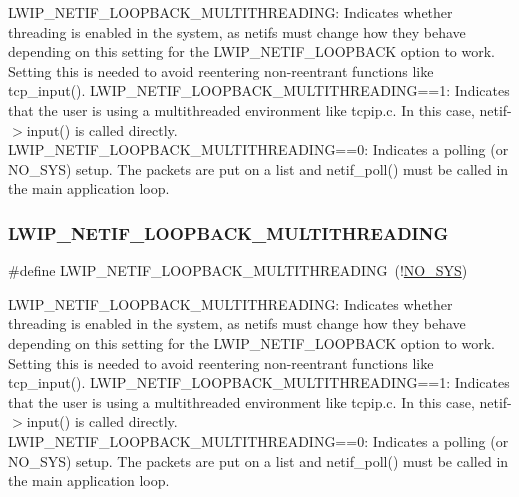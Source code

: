 L\+W\+I\+P\+\_\+\+N\+E\+T\+I\+F\+\_\+\+L\+O\+O\+P\+B\+A\+C\+K\+\_\+\+M\+U\+L\+T\+I\+T\+H\+R\+E\+A\+D\+I\+NG\+: Indicates whether threading is enabled in the system, as netifs must change how they behave depending on this setting for the L\+W\+I\+P\+\_\+\+N\+E\+T\+I\+F\+\_\+\+L\+O\+O\+P\+B\+A\+CK option to work. Setting this is needed to avoid reentering non-\/reentrant functions like tcp\+\_\+input(). L\+W\+I\+P\+\_\+\+N\+E\+T\+I\+F\+\_\+\+L\+O\+O\+P\+B\+A\+C\+K\+\_\+\+M\+U\+L\+T\+I\+T\+H\+R\+E\+A\+D\+I\+NG==1\+: Indicates that the user is using a multithreaded environment like tcpip.\+c. In this case, netif-\/$>$input() is called directly. L\+W\+I\+P\+\_\+\+N\+E\+T\+I\+F\+\_\+\+L\+O\+O\+P\+B\+A\+C\+K\+\_\+\+M\+U\+L\+T\+I\+T\+H\+R\+E\+A\+D\+I\+NG==0\+: Indicates a polling (or N\+O\+\_\+\+S\+YS) setup. The packets are put on a list and netif\+\_\+poll() must be called in the main application loop. \mbox{\label{group__lwip__opts__loop_gaa28d13ddd5281b1912276991e7ea58c5}} 
\subsubsection{\texorpdfstring{L\+W\+I\+P\+\_\+\+N\+E\+T\+I\+F\+\_\+\+L\+O\+O\+P\+B\+A\+C\+K\+\_\+\+M\+U\+L\+T\+I\+T\+H\+R\+E\+A\+D\+I\+NG}{LWIP\_NETIF\_LOOPBACK\_MULTITHREADING}\hspace{0.1cm}{\footnotesize\ttfamily [2/2]}}
{\footnotesize\ttfamily \#define L\+W\+I\+P\+\_\+\+N\+E\+T\+I\+F\+\_\+\+L\+O\+O\+P\+B\+A\+C\+K\+\_\+\+M\+U\+L\+T\+I\+T\+H\+R\+E\+A\+D\+I\+NG~(!\hyperlink{openmote-cc2538_2lwip_2test_2unit_2lwipopts_8h_ae00ba99de94a5bf84d832be8976df59b}{N\+O\+\_\+\+S\+YS})}

L\+W\+I\+P\+\_\+\+N\+E\+T\+I\+F\+\_\+\+L\+O\+O\+P\+B\+A\+C\+K\+\_\+\+M\+U\+L\+T\+I\+T\+H\+R\+E\+A\+D\+I\+NG\+: Indicates whether threading is enabled in the system, as netifs must change how they behave depending on this setting for the L\+W\+I\+P\+\_\+\+N\+E\+T\+I\+F\+\_\+\+L\+O\+O\+P\+B\+A\+CK option to work. Setting this is needed to avoid reentering non-\/reentrant functions like tcp\+\_\+input(). L\+W\+I\+P\+\_\+\+N\+E\+T\+I\+F\+\_\+\+L\+O\+O\+P\+B\+A\+C\+K\+\_\+\+M\+U\+L\+T\+I\+T\+H\+R\+E\+A\+D\+I\+NG==1\+: Indicates that the user is using a multithreaded environment like tcpip.\+c. In this case, netif-\/$>$input() is called directly. L\+W\+I\+P\+\_\+\+N\+E\+T\+I\+F\+\_\+\+L\+O\+O\+P\+B\+A\+C\+K\+\_\+\+M\+U\+L\+T\+I\+T\+H\+R\+E\+A\+D\+I\+NG==0\+: Indicates a polling (or N\+O\+\_\+\+S\+YS) setup. The packets are put on a list and netif\+\_\+poll() must be called in the main application loop. 